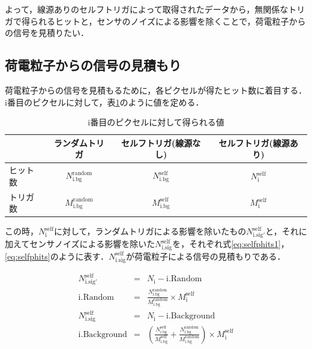 よって，線源ありのセルフトリガによって取得されたデータから，無関係なトリガで得られるヒットと，センサのノイズによる影響を除くことで，荷電粒子からの信号を見積りたい．

\subsection*{荷電粒子からの信号の見積もり}
荷電粒子からの信号を見積もるために，各ピクセルが得たヒット数に着目する．i番目のピクセルに対して，表\ref{tab:selfpara}のように値を定める．
  \begin{table}[h]
    \centering
    \caption{i番目のピクセルに対して得られる値}
    \begin{tabular} {l|ccc} \hline
      & ランダムトリガ & セルフトリガ(線源なし) & セルフトリガ(線源あり) \\ \hline \hline
      ヒット数 & $N_{\mathrm{i.bg}}^{\mathrm{random}}$& $N_{\mathrm{i.bg}}^{\mathrm{self}}$ & $N_{\mathrm{i}}^{\mathrm{self}}$ \\
      トリガ数 & $M_{\mathrm{i.bg}}^{\mathrm{random}}$ & $M_{\mathrm{i.bg}}^{\mathrm{self}}$& $M_{\mathrm{i}}^{\mathrm{self}}$\\ \hline
    \end{tabular}
    \label{tab:selfpara}
  \end{table}


この時，$N_{\mathrm{i}}^{\mathrm{self}}$に対して，ランダムトリガによる影響を除いたもの$N_{\mathrm{i.sig'}}^{\mathrm{self}}$と，それに加えてセンサノイズによる影響を除いた$N_{\mathrm{i.sig}}^{\mathrm{self}}$を，それぞれ式\ref{eq:selfphits1}，\ref{eq:selfphits}のように表す．$N_{\mathrm{i.sig}}^{\mathrm{self}}$が荷電粒子による信号の見積もりである．
  
\begin{eqnarray}
  \label{eq:selfphits1}
  N_{\mathrm{i.sig'}}^{\mathrm{self}} &=& N_{\mathrm{i}} - \mathrm{i.Random} \\
  \mathrm{i.Random} &=& \frac{N_{\mathrm{i.bg}}^{\mathrm{random}}}{M_{\mathrm{i.bg}}^{\mathrm{random}}} \times M_{\mathrm{i}}^{\mathrm{self}}\\ \nonumber
  \label{eq:selfphits}
  N_{\mathrm{i.sig}}^{\mathrm{self}} &=& N_{\mathrm{i}} - \mathrm{i.Background} \\
  \mathrm{i.Background} &=& \left(\frac{N_{\mathrm{i.bg}}^{\mathrm{self}}}{M_{\mathrm{i.bg}}^{\mathrm{self}}} + \frac{N_{\mathrm{i.bg}}^{\mathrm{random}}}{M_{\mathrm{i.bg}}^{\mathrm{random}}} \right) \times M_{\mathrm{i}}^{\mathrm{self}} \nonumber
\end{eqnarray}

